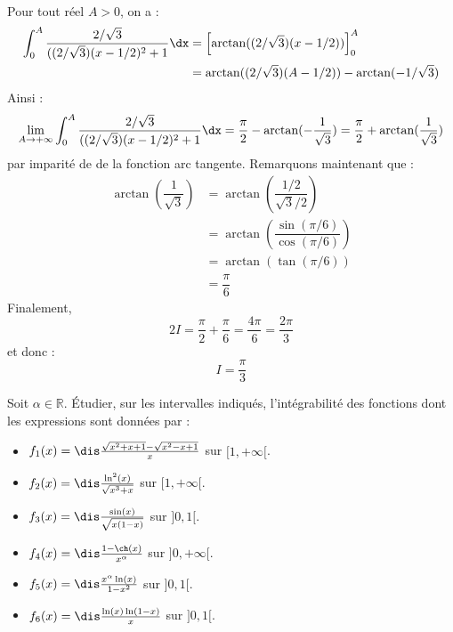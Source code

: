 \documentclass[a4paper,10pt]{report}
\begin{document}
\begin{enumerate}
\begin{align*}
\end{align*}
Pour tout réel $A >0$, on a :
\begin{align*}
\int_{0}^{A} \frac{2/\sqrt{3}}{((2/ \sqrt{3})(x-1/2)^2+1} \dx & = \left[ \arctan((2/ \sqrt{3})(x-1/2)) \right]_0^A \\
& = \arctan((2/ \sqrt{3})(A-1/2)) - \arctan(- 1/\sqrt{3})
\end{align*}
Ainsi :
$$ \lim_{A \rightarrow + \infty} \int_{0}^{A} \frac{2/\sqrt{3}}{((2/ \sqrt{3})(x-1/2)^2+1} \dx = \dfrac{\pi}{2} - \arctan(- \dfrac{1}{\sqrt{3}}) = \dfrac{\pi}{2} + \arctan(\dfrac{1}{\sqrt{3}})$$
par imparité de de la fonction arc tangente. Remarquons maintenant que :
\begin{align*}
\arctan \left(\dfrac{1}{\sqrt{3}}\right) & = \arctan\left(\dfrac{1/2}{\sqrt{3}/2}\right) \\
& =  \arctan \left(\dfrac{\sin(\pi/6)}{\cos(\pi/6)}\right) \\
& = \arctan\left(\tan(\pi/6)\right) \\
& = \dfrac{\pi}{6}
\end{align*}
Finalement,
$$ 2I = \dfrac{\pi}{2} + \dfrac{\pi}{6} = \dfrac{4\pi}{6} = \dfrac{2\pi}{3}$$
et donc :
$$ I = \dfrac{\pi}{3}$$

\end{enumerate} 

\begin{Exercice}{} Soit $\alpha \in \mathbb{R}$. Étudier, sur les intervalles indiqués, l'int\'egrabilit\'e des fonctions dont les expressions sont données par :
\begin{multicols}{2}
\begin{itemize}
\item $f_1(x)=\dis\frac{\sqrt{x^2+x+1}-\sqrt{x^2-x+1}}{x}$ sur \newline $[1,+\infty[$.
\item $f_2(x)=\dis\frac{\ln^2(x)}{\sqrt{x^3+x}}$ sur $[1,+\infty[$.
\item $f_3(x)=\dis\frac{\sin(x)}{\sqrt{x(1-x)}}$ sur $]0,1[$.
\columnbreak
\item $f_4(x)=\dis\frac{1-\ch(x)}{x^{\alpha}}$ sur $]0,+\infty[$.
\item $f_5(x)=\dis\frac{x^{\alpha}\ln(x)}{1-x^2}$ sur $]0,1[$.
\item $f_6(x)=\dis\frac{\ln(x)\ln(1-x)}{x}$ sur $]0,1[$.
\end{itemize}
\end{multicols}

\vspace{0.1cm}
\end{Exercice}
\end{document}
